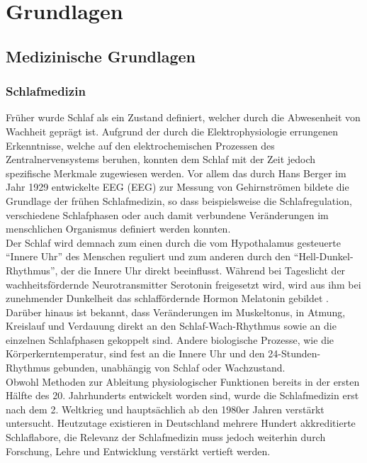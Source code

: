 \chapter{Grundlagen}


\section{Medizinische Grundlagen}\label{medgrundlagen} 


\subsection{Schlafmedizin}\label{schlafmedizin} 

Früher wurde Schlaf als ein Zustand definiert, welcher durch die Abwesenheit von Wachheit geprägt ist. Aufgrund der durch die Elektrophysiologie errungenen Erkenntnisse, welche auf den elektrochemischen Prozessen des Zentralnervensystems beruhen, konnten dem Schlaf mit der Zeit jedoch spezifische Merkmale zugewiesen werden. Vor allem das durch Hans Berger im Jahr 1929 entwickelte \acl{EEG} (\acs{EEG}) zur Messung von Gehirnströmen bildete die Grundlage der frühen Schlafmedizin, so dass beispielsweise die Schlafregulation, verschiedene Schlafphasen oder auch damit verbundene Veränderungen im menschlichen Organismus definiert werden konnten. \parencite{ebner_eeg_2006, penzel_schlafstorungen_2005}\\

Der Schlaf wird demnach zum einen durch die vom Hypothalamus gesteuerte "`Innere Uhr"' des Menschen reguliert und zum anderen durch den "`Hell-Dunkel-Rhythmus"', der die Innere Uhr direkt beeinflusst. Während bei Tageslicht der wachheitsfördernde Neurotransmitter Serotonin freigesetzt wird, wird aus ihm bei zunehmender Dunkelheit das schlaffördernde Hormon Melatonin gebildet \parencite{steinberg_schlafmedizin_2010}. Darüber hinaus ist bekannt, dass Veränderungen im Muskeltonus, in Atmung, Kreislauf und Verdauung direkt an den Schlaf-Wach-Rhythmus sowie an die einzelnen Schlafphasen gekoppelt sind. Andere biologische Prozesse, wie die Körperkerntemperatur, sind fest an die Innere Uhr und den 24-Stunden-Rhythmus gebunden, unabhängig von Schlaf oder Wachzustand. \parencite{penzel_schlafstorungen_2005, rasche_update_2003}\\

Obwohl Methoden zur Ableitung physiologischer Funktionen bereits in der ersten Hälfte des 20. Jahrhunderts entwickelt worden sind, wurde die Schlafmedizin erst nach dem 2. Weltkrieg und hauptsächlich ab den 1980er Jahren verstärkt untersucht. Heutzutage existieren in Deutschland mehrere Hundert akkreditierte Schlaflabore, die Relevanz der Schlafmedizin muss jedoch weiterhin durch Forschung, Lehre und Entwicklung verstärkt vertieft werden.\parencite{penzel_schlafstorungen_2005}\\

